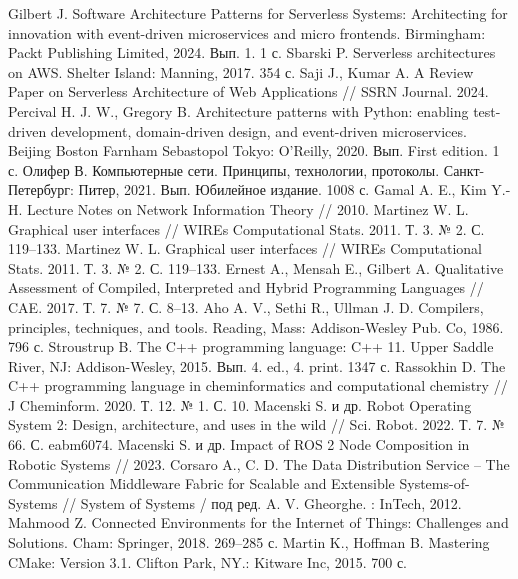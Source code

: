 \documentclass[a4paper, 14pt]{extreport}
\begin{document}
\begin{thebibliography}{9}
          Gilbert J. Software Architecture Patterns for Serverless Systems: Architecting for innovation with event-driven microservices and micro frontends. Birmingham: Packt Publishing Limited, 2024. Вып. 1. 1 с.
         Sbarski P. Serverless architectures on AWS. Shelter Island: Manning, 2017. 354 с.
          Saji J., Kumar A. A Review Paper on Serverless Architecture of Web Applications // SSRN Journal. 2024.
             Percival H. J. W., Gregory B. Architecture patterns with Python: enabling test-driven development, domain-driven design, and event-driven microservices. Beijing Boston Farnham Sebastopol Tokyo: O’Reilly, 2020. Вып. First edition. 1 с.
          Олифер В. Компьютерные сети. Принципы, технологии, протоколы. Санкт-Петербург: Питер, 2021. Вып. Юбилейное издание. 1008 с.
          Gamal A. E., Kim Y.-H. Lecture Notes on Network Information Theory // 2010.
              Martinez W. L. Graphical user interfaces // WIREs Computational Stats. 2011. Т. 3. № 2. С. 119–133.
              Martinez W. L. Graphical user interfaces // WIREs Computational Stats. 2011. Т. 3. № 2. С. 119–133.
          Ernest A., Mensah E., Gilbert A. Qualitative Assessment of Compiled, Interpreted and Hybrid Programming Languages // CAE. 2017. Т. 7. № 7. С. 8–13.
          Aho A. V., Sethi R., Ullman J. D. Compilers, principles, techniques, and tools. Reading, Mass: Addison-Wesley Pub. Co, 1986. 796 с.
             Stroustrup B. The C++ programming language: C++ 11. Upper Saddle River, NJ: Addison-Wesley, 2015. Вып. 4. ed., 4. print. 1347 с.
          Rassokhin D. The C++ programming language in cheminformatics and computational chemistry // J Cheminform. 2020. Т. 12. № 1. С. 10.
             Macenski S. и др. Robot Operating System 2: Design, architecture, and uses in the wild // Sci. Robot. 2022. Т. 7. № 66. С. eabm6074.
             Macenski S. и др. Impact of ROS 2 Node Composition in Robotic Systems // 2023.
             Corsaro A., C. D. The Data Distribution Service – The Communication Middleware Fabric for Scalable and Extensible Systems-of-Systems // System of Systems / под ред. A. V. Gheorghe. : InTech, 2012.
             Mahmood Z. Connected Environments for the Internet of Things: Challenges and Solutions. Cham: Springer, 2018. 269–285 с.
           Martin K., Hoffman B. Mastering CMake: Version 3.1. Clifton Park, NY.: Kitware Inc, 2015. 700 с.

\end{thebibliography}
\end{document}
